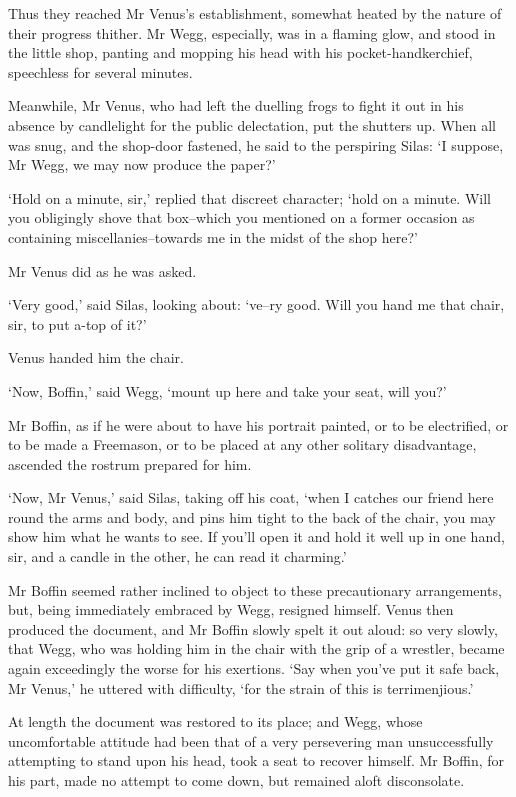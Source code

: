 Thus they reached Mr Venus’s establishment, somewhat heated by the
nature of their progress thither. Mr Wegg, especially, was in a flaming
glow, and stood in the little shop, panting and mopping his head with
his pocket-handkerchief, speechless for several minutes.

Meanwhile, Mr Venus, who had left the duelling frogs to fight it out in
his absence by candlelight for the public delectation, put the shutters
up. When all was snug, and the shop-door fastened, he said to the
perspiring Silas: ‘I suppose, Mr Wegg, we may now produce the paper?’

‘Hold on a minute, sir,’ replied that discreet character; ‘hold on a
minute. Will you obligingly shove that box--which you mentioned on a
former occasion as containing miscellanies--towards me in the midst of
the shop here?’

Mr Venus did as he was asked.

‘Very good,’ said Silas, looking about: ‘ve--ry good. Will you hand me
that chair, sir, to put a-top of it?’

Venus handed him the chair.

‘Now, Boffin,’ said Wegg, ‘mount up here and take your seat, will you?’

Mr Boffin, as if he were about to have his portrait painted, or to be
electrified, or to be made a Freemason, or to be placed at any other
solitary disadvantage, ascended the rostrum prepared for him.

‘Now, Mr Venus,’ said Silas, taking off his coat, ‘when I catches our
friend here round the arms and body, and pins him tight to the back of
the chair, you may show him what he wants to see. If you’ll open it and
hold it well up in one hand, sir, and a candle in the other, he can read
it charming.’

Mr Boffin seemed rather inclined to object to these precautionary
arrangements, but, being immediately embraced by Wegg, resigned himself.
Venus then produced the document, and Mr Boffin slowly spelt it out
aloud: so very slowly, that Wegg, who was holding him in the chair
with the grip of a wrestler, became again exceedingly the worse for his
exertions. ‘Say when you’ve put it safe back, Mr Venus,’ he uttered with
difficulty, ‘for the strain of this is terrimenjious.’

At length the document was restored to its place; and Wegg, whose
uncomfortable attitude had been that of a very persevering man
unsuccessfully attempting to stand upon his head, took a seat to recover
himself. Mr Boffin, for his part, made no attempt to come down, but
remained aloft disconsolate.

